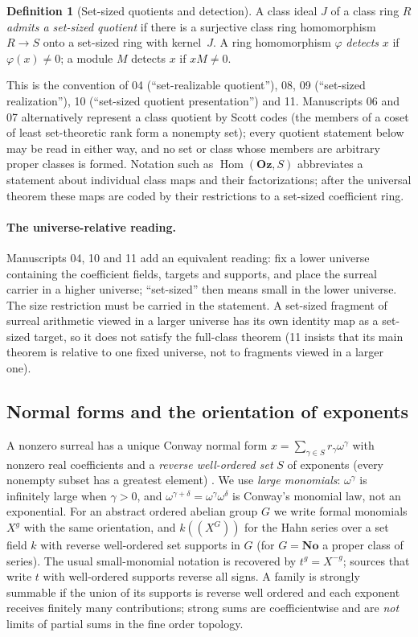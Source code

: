 \documentclass[11pt,letterpaper]{article}
\numberwithin{equation}{section}
\theoremstyle{definition}
\newtheorem{definition}[definition]{Definition}
\theoremstyle{remark}
\theoremstyle{plain}
\newcommand{\No}{\mathbf{No}}
\newcommand{\Oz}{\mathbf{Oz}}
\newcommand{\hahn}[2]{#1(\!(X^{#2})\!)}
\newcommand{\Hom}{\operatorname{Hom}}
\begin{document}
\begin{definition}[Set-sized quotients and detection]\label{osq:def:setquotient}
A class ideal $J$ of a class ring $R$ \emph{admits a set-sized quotient} if there is a
surjective class ring homomorphism $R\to S$ onto a set-sized ring with kernel~$J$.
A ring homomorphism $\varphi$ \emph{detects} $x$ if $\varphi(x)\neq0$; a module $M$
detects $x$ if $xM\neq0$.
\end{definition}

This is the convention of 04 (``set-realizable quotient''), 08, 09 (``set-sized
realization''), 10 (``set-sized quotient presentation'') and 11. Manuscripts 06 and 07
alternatively represent a class quotient by Scott codes (the members of a coset of least
set-theoretic rank form a nonempty set); every quotient statement below may be read in
either way, and no set or class whose members are arbitrary proper classes is formed.
Notation such as $\Hom(\Oz,S)$ abbreviates a statement about individual class maps and
their factorizations; after the universal theorem these maps are coded by their
restrictions to a set-sized coefficient ring.

\paragraph{The universe-relative reading.} Manuscripts 04, 10 and 11 add an equivalent
reading: fix a lower universe containing the coefficient fields, targets and supports,
and place the surreal carrier in a higher universe; ``set-sized'' then means small in the
lower universe. The size restriction must be carried in the statement. A set-sized
fragment of surreal arithmetic viewed in a larger universe has its own identity map as a
set-sized target, so it does not satisfy the full-class theorem (11 insists that its main
theorem is relative to one fixed universe, not to fragments viewed in a larger one).

\subsection{Normal forms and the orientation of exponents}\label{osq:sub:orientation}
A nonzero surreal has a unique Conway normal form
$x=\sum_{\gamma\in S}r_\gamma\omega^\gamma$ with nonzero real coefficients and a
\emph{reverse well-ordered set} $S$ of exponents (every nonempty subset has a greatest
element) \cite{Conway,Gonshor,Berarducci}. We use \emph{large monomials}:
$\omega^\gamma$ is infinitely large when $\gamma>0$, and
$\omega^{\gamma+\delta}=\omega^\gamma\omega^\delta$ is Conway's monomial law, not an
exponential. For an abstract ordered abelian group $G$ we write formal monomials $X^g$
with the same orientation, and $\hahn kG$ for the Hahn series over a set field $k$ with
reverse well-ordered set supports in $G$ (for $G=\No$ a proper class of series). The
usual small-monomial notation is recovered by $t^g=X^{-g}$; sources that write $t$
with well-ordered supports reverse all signs. A family is strongly summable if the
union of its supports is reverse well ordered and each exponent receives finitely many
contributions; strong sums are coefficientwise and are \emph{not} limits of partial sums
in the fine order topology.
\end{document}
